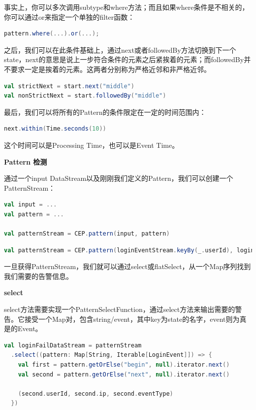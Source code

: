 \documentclass[oneside]{ctexbook}
\begin{document}
事实上，你可以多次调用subtype和where方法；而且如果where条件是不相关的，你可以通过or来指定一个单独的filter函数：

\begin{lstlisting}[language=scala]
pattern.where(...).or(...);
\end{lstlisting}

之后，我们可以在此条件基础上，通过next或者followedBy方法切换到下一个state，next的意思是说上一步符合条件的元素之后紧挨着的元素；而followedBy并不要求一定是挨着的元素。这两者分别称为严格近邻和非严格近邻。

\begin{lstlisting}[language=scala]
val strictNext = start.next("middle")
val nonStrictNext = start.followedBy("middle")
\end{lstlisting}

最后，我们可以将所有的Pattern的条件限定在一定的时间范围内：

\begin{lstlisting}[language=scala]
next.within(Time.seconds(10))
\end{lstlisting}

这个时间可以是Processing Time，也可以是Event Time。

\textbf{Pattern 检测}

通过一个input DataStream以及刚刚我们定义的Pattern，我们可以创建一个PatternStream：

\begin{lstlisting}[language=scala]
val input = ...
val pattern = ...

val patternStream = CEP.pattern(input, pattern)
\end{lstlisting}

\begin{lstlisting}[language=scala]
val patternStream = CEP.pattern(loginEventStream.keyBy(_.userId), loginFailPattern)
\end{lstlisting}

一旦获得PatternStream，我们就可以通过select或flatSelect，从一个Map序列找到我们需要的告警信息。

\textbf{select}

select方法需要实现一个PatternSelectFunction，通过select方法来输出需要的警告。它接受一个Map对，包含string/event，其中key为state的名字，event则为真是的Event。

\begin{lstlisting}[language=scala]
val loginFailDataStream = patternStream
  .select((pattern: Map[String, Iterable[LoginEvent]]) => {
    val first = pattern.getOrElse("begin", null).iterator.next()
    val second = pattern.getOrElse("next", null).iterator.next()

    (second.userId, second.ip, second.eventType)
  })
\end{lstlisting}
\end{document}
